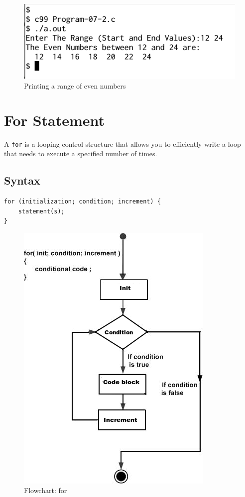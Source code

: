 \documentclass[11pt,a4paper]{article}
\begin{document}
\begin{figure}[ht]
\begin{center}
\includegraphics[scale=0.6]{Output-07-2.png}
\caption{Printing a range of even numbers}
\label{output-07-2}

\end{center}
\end{figure}

\section*{For Statement}
A \lstinline!for! is a looping control structure that allows you to efficiently write a loop that needs to execute a specified number of times.

\subsection*{Syntax}
\begin{lstlisting}[numbers=none]
for (initialization; condition; increment) {
    statement(s);
}
\end{lstlisting}
\begin{figure}[ht]

\begin{center}
\includegraphics[scale=0.5]{for_loop.png}
\caption{Flowchart: for}
\label{Flowchart:for}
\end{center}
\end{figure}
\end{document}
